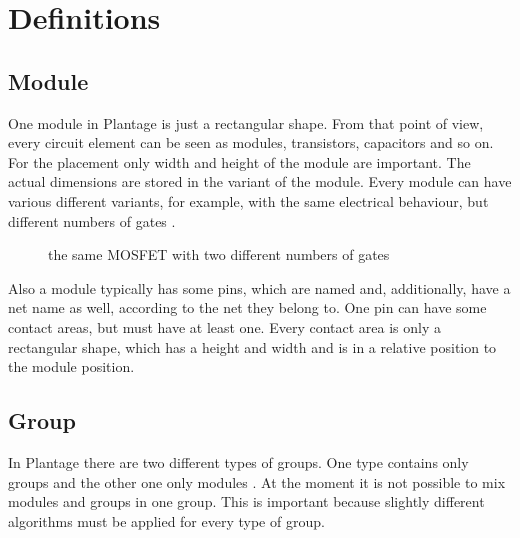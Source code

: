 \chapter{Definitions}

\section{Module}
One module in Plantage is just a rectangular shape. From that point of view, every circuit element can be seen as modules, transistors, capacitors and so on. For the placement only width and height of the module are important. The actual dimensions are stored in the variant of the module. Every module can have various different variants, for example, with the same electrical behaviour, but different numbers of gates .

\begin{figure}
	\centering
	
	\caption{the same MOSFET with two different numbers of gates}
	\label{fig:modules_with_different_gate_number}
\end{figure}

Also a module typically has some pins, which are named and, additionally, have a net name as well, according to the net they belong to. One pin can have some contact areas, but must have at least one. Every contact area is only a rectangular shape, which has a height and width and is in a relative position to the module position.

\section{Group}
In Plantage there are two different types of groups. One type contains only groups and the other one only modules . At the moment it is not possible to mix modules and groups in one group. This is important because slightly different algorithms must be applied for every type of group.

